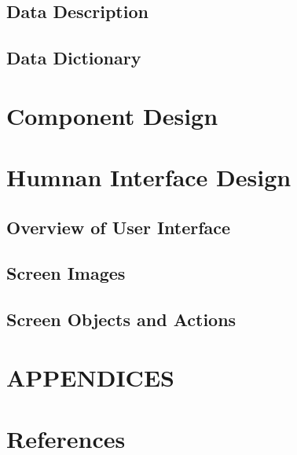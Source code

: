 \documentclass[12pt]{article}
\begin{document}
\subsection{Data Description}

\subsection {Data Dictionary}

\section{Component Design}

\section{Humnan Interface Design}

\subsection {Overview of User Interface}

\subsection {Screen Images}

\subsection {Screen Objects and Actions}

\section{APPENDICES}

\section {References}
\end{document}
